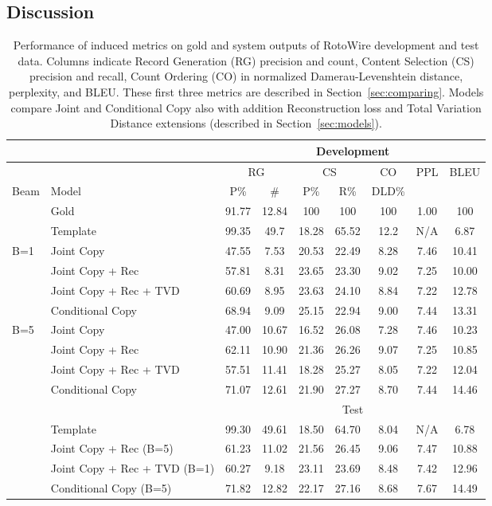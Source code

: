 \documentclass[11pt,letterpaper]{article}
\begin{document}
\subsection{Discussion}
\begin{table*}
\small
\centering
\begin{tabular}{llccccccc}
\toprule
  & & \multicolumn{7}{c}{Development} \\
\midrule
& & \multicolumn{2}{c}{RG}  & \multicolumn{2}{c}{CS} & CO & PPL & BLEU\\
Beam & Model & P\% & \# & P\% & R\% & DLD\% &  & \\
\midrule
&Gold                 & 91.77 & 12.84 & 100   & 100   & 100  & 1.00 & 100 \\
&Template             & 99.35 & 49.7  & 18.28 & 65.52 & 12.2 & N/A  & 6.87   \\
\midrule
\multirow{ 4}{*}{B=1} & Joint Copy             & 47.55 & 7.53  & 20.53 & 22.49 & 8.28 & 7.46 & 10.41 \\

&Joint Copy + Rec  & 57.81 & 8.31  & 23.65 & 23.30 & 9.02 & 7.25 & 10.00 \\

&Joint Copy  + Rec + TVD  & 60.69 & 8.95 & 23.63 & 24.10 & 8.84 & 7.22 & 12.78 \\

&Conditional Copy       & 68.94 & 9.09  & 25.15 & 22.94 & 9.00 & 7.44 & 13.31 \\
\midrule
\multirow{ 4}{*}{B=5}  &Joint Copy             & 47.00 & 10.67 & 16.52 & 26.08 & 7.28 & 7.46 & 10.23 \\
&Joint Copy  + Rec  & 62.11 & 10.90 & 21.36 & 26.26 & 9.07 & 7.25 & 10.85 \\
&Joint Copy  + Rec + TVD  & 57.51 & 11.41 & 18.28 & 25.27 & 8.05 & 7.22 & 12.04 \\
&Conditional Copy        & 71.07 & 12.61 & 21.90 & 27.27 & 8.70 & 7.44 & 14.46 \\
\midrule

  & & \multicolumn{7}{c}{Test} \\
\midrule
&Template                 & 99.30 & 49.61 & 18.50 & 64.70 & 8.04 & N/A  & 6.78   \\
&Joint Copy + Rec (B=5)      & 61.23 & 11.02 & 21.56 & 26.45 & 9.06 & 7.47 & 10.88 \\
&Joint Copy + Rec + TVD (B=1) & 60.27 & 9.18  & 23.11 & 23.69 & 8.48 & 7.42 & 12.96 \\
&Conditional Copy (B=5)            & 71.82 & 12.82 & 22.17 & 27.16 & 8.68 & 7.67 & 14.49 \\
\bottomrule
\end{tabular}
\caption{Performance of induced metrics on gold and system outputs of RotoWire development and test data. 
  Columns indicate Record Generation (RG) precision and count, Content Selection (CS) precision and recall, 
  Count Ordering (CO) in normalized Damerau-Levenshtein distance, perplexity, and BLEU. These first three metrics are described in Section~\ref{sec:comparing}. Models compare Joint and Conditional 
  Copy also with addition Reconstruction loss and Total Variation Distance extensions (described in Section~\ref{sec:models}).
}
\label{tab:maintestresults}
\end{table*} 
 
\end{document}
